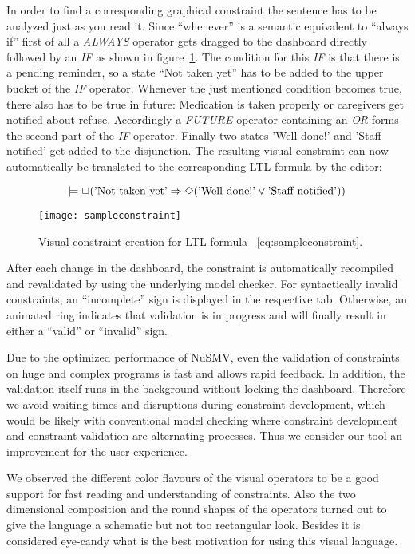 In order to find a corresponding graphical constraint the sentence has to be analyzed just as you read it. Since ``whenever'' is a semantic equivalent to ``always if'' first of all a \emph{ALWAYS} operator gets dragged to the dashboard directly followed by an \emph{IF} as shown in figure~\ref{fig:sampleconstraint}. The condition for this \emph{IF} is that there is a pending reminder, so a state ``Not taken yet'' has to be added to the upper bucket of the \emph{IF} operator.
Whenever the just mentioned condition becomes true, there also has to be true in future: Medication is taken properly or caregivers get notified about refuse. Accordingly a \emph{FUTURE} operator containing an \emph{OR} forms the second part of the \emph{IF} operator. Finally two states 'Well done!' and 'Staff notified' get added to the disjunction. The resulting visual constraint can now automatically be translated to the corresponding LTL formula by the editor:

\begin{equation} \label{eq:sampleconstraint}
  \models \Box (\textnormal{'Not taken yet'} \Rightarrow \Diamond (\textnormal{'Well done!'} \vee \textnormal{'Staff notified'}))
\end{equation}

\begin{figure}[htbp]
  \centering
  \texttt{[image: sampleconstraint]}
  \caption{Visual constraint creation for LTL formula ~\ref{eq:sampleconstraint}.}
  \label{fig:sampleconstraint}
\end{figure}

After each change in the dashboard, the constraint is automatically recompiled and revalidated by using the underlying model checker. For syntactically invalid constraints, an ``incomplete'' sign is displayed in the respective tab. Otherwise, an animated ring indicates that validation is in pro\-gress and will finally result in either a ``valid'' or ``invalid'' sign.

Due to the optimized performance of NuSMV, even the validation of constraints on huge and complex programs is fast and allows rapid feedback. In addition, the validation itself runs in the background without locking the dashboard. Therefore we avoid waiting times and disruptions during constraint development, which would be likely with conventional model checking where constraint development and constraint validation are alternating processes. Thus we consider our tool an improvement for the user experience.

We observed the different color flavours of the visual operators to be a good support for fast reading and understanding of constraints. Also the two dimensional composition and the round shapes of the operators turned out to 
give the language a schematic but not too rectangular look. Besides it is considered eye-candy what is the best motivation for using this visual language.





